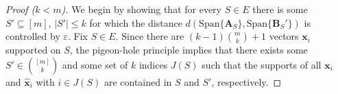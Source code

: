 \documentclass[9pt,twocolumn]{pnas-new}
\begin{document}
\begin{proof}[Proof ($k < m$)] 

We begin by showing that for every $S \in E$ there is some $S' \subseteq [m]$, $|S'| \leq k$ for which the distance $d(\text{Span}\{\mathbf{A}_S\}, \text{Span}\{\mathbf{B}_S'\})$ is controlled by $\varepsilon$. Fix $S \in E$. Since there are $(k-1){m \choose k}+1$ vectors $\mathbf{x}_i$ supported on $S$, the pigeon-hole principle implies that there exists some $S' \in {[m] \choose k}$ and some set of $k$ indices $J(S)$ such that the supports of all $\mathbf{x}_i$ and $\mathbf{\hat x}_i$ with $i \in J(S)$ are contained in $S$ and $S'$, respectively.


\end{proof}
\end{document}
